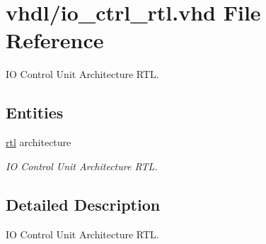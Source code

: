 \hypertarget{io__ctrl__rtl_8vhd}{}\section{vhdl/io\+\_\+ctrl\+\_\+rtl.vhd File Reference}
\label{io__ctrl__rtl_8vhd}


IO Control Unit Architecture R\+TL.  


\subsection*{Entities}
\begin{DoxyCompactItemize}
\item 
\hyperlink{classio__ctrl_1_1rtl}{rtl} architecture
\begin{DoxyCompactList}\small\item\em IO Control Unit Architecture R\+TL. \end{DoxyCompactList}\end{DoxyCompactItemize}


\subsection{Detailed Description}
IO Control Unit Architecture R\+TL. 

